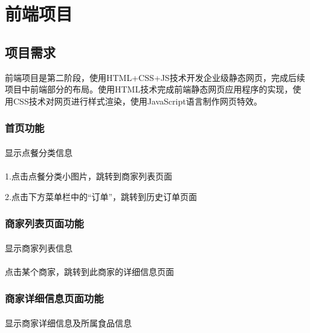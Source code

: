 
\chapter{前端项目}

\section{项目需求}

前端项目是第二阶段，使用HTML+CSS+JS技术开发企业级静态网页，完成后续项目中前端部分的布局。使用HTML技术完成前端静态网页应用程序的实现，使用CSS技术对网页进行样式渲染，使用JavaScript语言制作网页特效。~\\

\subsection{首页功能}
\subsubsection*{}
显示点餐分类信息
\subsubsection*{}
1.点击点餐分类小图片，跳转到商家列表页面

2.点击下方菜单栏中的“订单”，跳转到历史订单页面~\\

\subsection{商家列表页面功能}
\subsubsection*{}
显示商家列表信息
\subsubsection*{}
点击某个商家，跳转到此商家的详细信息页面~\\

\subsection{商家详细信息页面功能}
\subsubsection*{}
显示商家详细信息及所属食品信息
